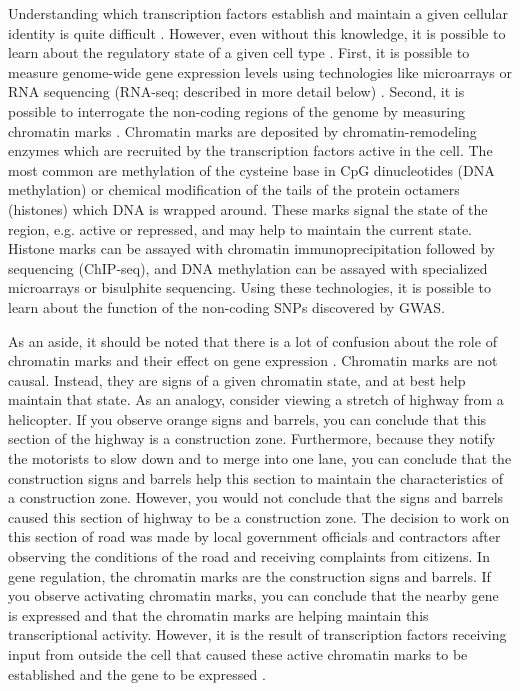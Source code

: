 Understanding which transcription factors establish and maintain a
given cellular identity is quite difficult \citep{Vaquerizas2009, Biggin2011, Zaret2016}. However, even without this
knowledge, it is possible to learn about the regulatory state of a
given cell type \citep{Ho2014}. First, it is possible to measure genome-wide gene
expression levels using technologies like microarrays or RNA
sequencing (RNA-seq; described in more detail below) \citep{Wang2009, Oshlack2010, Waern2011}. Second, it is possible to interrogate
the non-coding regions of the genome by measuring chromatin
marks \citep{Park2009, Landt2012}. Chromatin marks are deposited by chromatin-remodeling enzymes
which are recruited by the transcription factors active in the
cell. The most common are methylation of the cysteine base in CpG
dinucleotides (DNA methylation) or chemical modification of the tails
of the protein octamers (histones) which DNA is wrapped around. These
marks signal the state of the region, e.g. active or repressed, and may
help to maintain the current state. Histone marks can be assayed with
chromatin immunoprecipitation followed by sequencing (ChIP-seq), and
DNA methylation can be assayed with specialized microarrays or
bisulphite sequencing. Using these technologies, it is possible to
learn about the function of the non-coding SNPs discovered by GWAS.

As an aside, it should be noted that there is a lot of confusion about
the role of chromatin marks and their effect on gene
expression \citep{Henikoff2011}. Chromatin marks are not causal. Instead, they are signs of
a given chromatin state, and at best help maintain that state. As an
analogy, consider viewing a stretch of highway from a helicopter. If
you observe orange signs and barrels, you can conclude that this
section of the highway is a construction zone. Furthermore, because
they notify the motorists to slow down and to merge into one lane, you
can conclude that the construction signs and barrels help this
section to maintain the characteristics of a construction
zone. However, you would not conclude that the signs and barrels
caused this section of highway to be a construction zone. The decision
to work on this section of road was made by local government officials
and contractors after observing the conditions of the road and
receiving complaints from citizens. In gene regulation, the chromatin
marks are the construction signs and barrels. If you observe
activating chromatin marks, you can conclude that the nearby gene is
expressed and that the chromatin marks are helping maintain this
transcriptional activity. However, it is the result of transcription
factors receiving input from outside the cell that caused these active
chromatin marks to be established and the gene to be expressed \citep{Natoli2010}.

